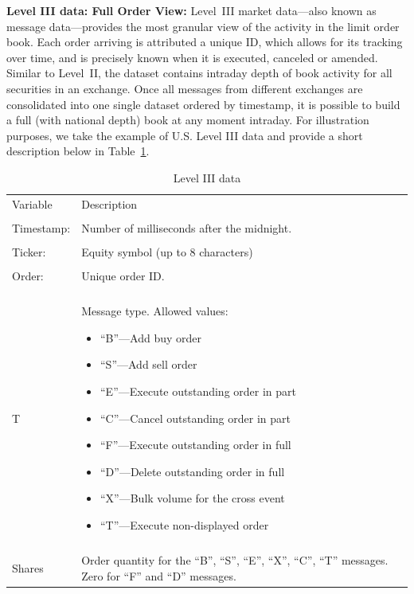 \noindent\textbf{Level III data: Full Order View:} Level~III market data---also known as message data---provides the most granular view of the activity in the limit order book. Each order arriving is attributed a unique ID, which allows for its tracking over time, and is precisely known when it is executed, canceled or amended. Similar to Level~II, the dataset contains intraday depth of book activity for all securities in an exchange. Once all messages from different exchanges are consolidated into one single dataset ordered by timestamp, it is possible to build a full (with national depth) book at any moment intraday. For illustration purposes, we take the example of U.S. Level III data and provide a short description below in Table~\ref{tab:level3data}.
	\begin{table}[!ht]
	\centering
	\caption{Level III data \label{tab:level3data}}
	\begin{tabular}{lp{}} \hline
	Variable & Description \\
	& \\
	Timestamp: & Number of milliseconds after the midnight. \\
	& \\
	Ticker: & Equity symbol (up to 8 characters) \\
	& \\
	Order: & Unique order ID. \\
	& \\
	T & Message type. Allowed values: \newline \begin{minipage}[t]{0.6\textwidth} \begin{itemize} \item ``B''---Add buy order \item ``S''---Add sell order \item ``E''---Execute outstanding order in part \item ``C''---Cancel outstanding order in part \item ``F''---Execute outstanding order in full \item ``D''---Delete outstanding order in full \item ``X''---Bulk volume for the cross event \item ``T''---Execute non-displayed order \end{itemize} \end{minipage} \\
	& \\
	Shares & Order quantity for the ``B'', ``S'', ``E'', ``X'', ``C'', ``T'' messages. Zero for ``F'' and ``D'' messages. \\

\end{tabular}
\end{table}

